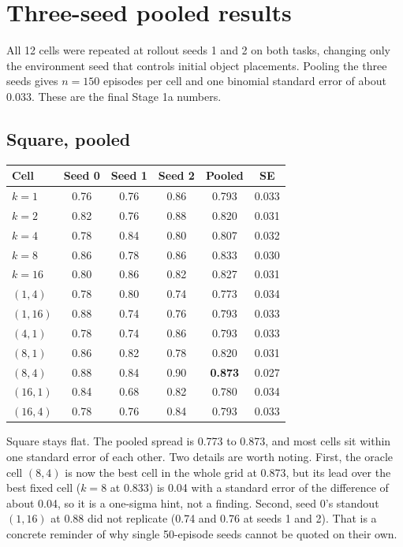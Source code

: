 \documentclass[11pt]{article}
\begin{document}
\section{Three-seed pooled results}
\label{sec:pooled}

All 12 cells were repeated at rollout seeds 1 and 2 on both tasks, changing only
the environment seed that controls initial object placements. Pooling the three
seeds gives $n{=}150$ episodes per cell and one binomial standard error of about
0.033. These are the final Stage 1a numbers.

\subsection{Square, pooled}

\begin{center}
\small
\begin{tabular}{@{}lccccc@{}}
\toprule
Cell & Seed 0 & Seed 1 & Seed 2 & Pooled & SE \\
\midrule
$k{=}1$  & 0.76 & 0.76 & 0.86 & 0.793 & 0.033 \\
$k{=}2$  & 0.82 & 0.76 & 0.88 & 0.820 & 0.031 \\
$k{=}4$  & 0.78 & 0.84 & 0.80 & 0.807 & 0.032 \\
$k{=}8$  & 0.86 & 0.78 & 0.86 & 0.833 & 0.030 \\
$k{=}16$ & 0.80 & 0.86 & 0.82 & 0.827 & 0.031 \\
\midrule
$(1,4)$  & 0.78 & 0.80 & 0.74 & 0.773 & 0.034 \\
$(1,16)$ & 0.88 & 0.74 & 0.76 & 0.793 & 0.033 \\
$(4,1)$  & 0.78 & 0.74 & 0.86 & 0.793 & 0.033 \\
$(8,1)$  & 0.86 & 0.82 & 0.78 & 0.820 & 0.031 \\
$(8,4)$  & 0.88 & 0.84 & 0.90 & \textbf{0.873} & 0.027 \\
$(16,1)$ & 0.84 & 0.68 & 0.82 & 0.780 & 0.034 \\
$(16,4)$ & 0.78 & 0.76 & 0.84 & 0.793 & 0.033 \\
\bottomrule
\end{tabular}
\end{center}

Square stays flat. The pooled spread is 0.773 to 0.873, and most cells sit within
one standard error of each other. Two details are worth noting. First, the oracle
cell $(8,4)$ is now the best cell in the whole grid at 0.873, but its lead over the
best fixed cell ($k{=}8$ at 0.833) is 0.04 with a standard error of the difference
of about 0.04, so it is a one-sigma hint, not a finding. Second, seed 0's standout
$(1,16)$ at 0.88 did not replicate (0.74 and 0.76 at seeds 1 and 2). That is a
concrete reminder of why single 50-episode seeds cannot be quoted on their own.
\end{document}
